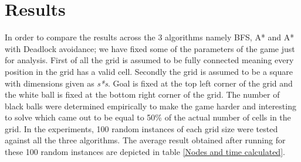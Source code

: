 \documentclass[letterpaper]{article}
\begin{document}
\section{Results}
In order to compare the results across the 3 algorithms namely BFS, A* and A* with Deadlock avoidance; we have fixed some of the parameters of the game just for analysis. First of all the grid is assumed to be fully connected meaning every position in the grid has a valid cell. Secondly the grid is assumed to be a square with dimensions given as \emph{s*s}. Goal is fixed at the top left corner of the grid and the white ball is fixed at the bottom right corner of the grid. The number of black balls were determined empirically to make the game harder and interesting to solve which came out to be equal to 50\% of the actual number of cells in the grid. In the experiments, 100 random instances of each grid size were tested against all the three algorithms. The average result obtained after running for these 100 random instances are depicted in table \ref{Nodes and time calculated}.     
  
\end{document}
